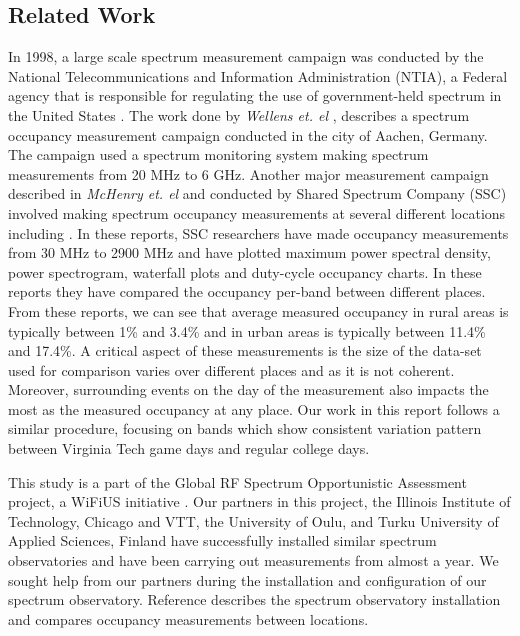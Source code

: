 \documentclass[12pt,sts]{report}
\begin{document}
\subsection{Related Work}

In 1998, a large scale spectrum measurement campaign was conducted by the National Telecommunications and Information Administration (NTIA), a Federal agency that is responsible for regulating the use of government-held spectrum in the United States \cite{750342}. The work done by \textit{Wellens et. el} \cite{4549835}, describes a spectrum occupancy measurement campaign conducted in the city of Aachen, Germany. The campaign used a spectrum monitoring system making spectrum measurements from 20 MHz to 6 GHz. %
Another major measurement campaign described in \textit{McHenry et. el} \cite{McHenry:2006:CSO:1234388.1234389} and conducted by Shared Spectrum Company (SSC) involved making spectrum occupancy measurements at several different locations including %
\cite{SSCSpecReports}. In these reports, SSC researchers have made occupancy measurements from 30 MHz to 2900 MHz and have plotted maximum power spectral density, power spectrogram, waterfall plots and duty-cycle occupancy charts. In these reports they have compared the occupancy per-band between different places. From these reports, we can see that average measured occupancy in rural areas is typically between 1\% and 3.4\% and in urban areas is typically between 11.4\% and 17.4\%. A critical aspect of these measurements is the size of the data-set used for comparison varies over different places and as it is not coherent. Moreover, surrounding events on the day of the measurement also impacts the most as the measured occupancy at any place. Our work in this report follows a similar procedure, focusing on bands which show consistent variation pattern between Virginia Tech game days and regular college days. 

This study is a part of the Global RF Spectrum Opportunistic Assessment project, a WiFiUS initiative \cite{HAGER_GRANT}. Our partners in this project, the Illinois Institute of Technology, Chicago and VTT, the University of Oulu, and Turku University of Applied Sciences, Finland have successfully installed similar spectrum observatories and have been carrying out measurements from almost a year. We sought help from our partners during the installation and configuration of our spectrum observatory. Reference \cite{6849666} describes the spectrum observatory installation and compares occupancy measurements between locations.
\end{document}
